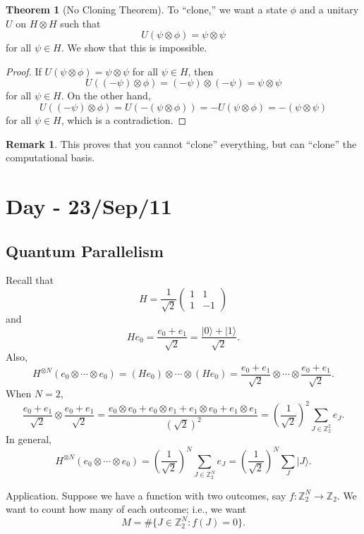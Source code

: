 \documentclass[12pt]{article}
\theoremstyle{definition}
\newtheorem*{theorem}{Theorem}
\newtheorem*{remark}{Remark}
\newcommand{\ket}[1]{|#1\rangle}
\newcommand{\Z}{\mathbb{Z}}
\begin{document}
\begin{theorem}[No Cloning Theorem]
To ``clone,'' we want a state $\phi$ and a unitary $U$ on $H \otimes H$ such that
\[
U(\psi \otimes \phi) = \psi \otimes \psi
\]
for all $\psi \in H$. We show that this is impossible.
\end{theorem}

\begin{proof}
If $U(\psi \otimes \phi) = \psi \otimes \psi$ for all $\psi \in H$, then
\[
U((-\psi) \otimes \phi) = (-\psi) \otimes (-\psi) = \psi \otimes \psi
\]
for all $\psi \in H$. On the other hand,
\[
U((-\psi) \otimes \phi) = U(-(\psi \otimes \phi)) = -U(\psi \otimes \phi) = -(\psi \otimes \psi)
\]
for all $\psi \in H$, which is a contradiction.
\end{proof}

\begin{remark}
This proves that you cannot ``clone'' everything, but can ``clone'' the computational basis.
\end{remark}

\section{Day - 23/Sep/11}

\subsection{Quantum Parallelism}

Recall that
\[
H = \frac{1}{\sqrt{2}}\begin{pmatrix}1&1\\1&-1\end{pmatrix}
\]
and
\[
He_0 = \frac{e_0+e_1}{\sqrt{2}} = \frac{\ket{0}+\ket{1}}{\sqrt{2}}.
\]
Also,
\[
H^{\otimes N}(e_0 \otimes \cdots \otimes e_0) = (He_0) \otimes \cdots \otimes (He_0) = \frac{e_0+e_1}{\sqrt{2}} \otimes \cdots \otimes \frac{e_0+e_1}{\sqrt{2}}.
\]
When $N=2$,
\[
\frac{e_0+e_1}{\sqrt{2}} \otimes \frac{e_0+e_1}{\sqrt{2}} = \frac{e_0\otimes e_0 + e_0\otimes e_1 + e_1\otimes e_0 + e_1\otimes e_1}{(\sqrt{2})^2} = \left(\frac{1}{\sqrt{2}}\right)^2 \sum_{J\in \Z_2^2} e_J.
\]
In general,
\[
H^{\otimes N}(e_0 \otimes \cdots \otimes e_0) = \left(\frac{1}{\sqrt{2}}\right)^N \sum_{J\in \Z_2^N} e_J = \left(\frac{1}{\sqrt{2}}\right)^N \sum_J \ket{J}.
\]

Application. Suppose we have a function with two outcomes, say $f : \Z_2^N \to \Z_2$. We want to count how many of each outcome; i.e., we want
\[
M = \#\{J \in \Z_2^N : f(J) = 0\}.
\]
\end{document}
